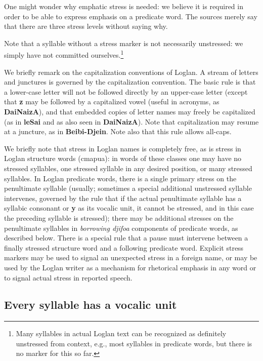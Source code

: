 \documentclass[12pt]{book}
\begin{document}
One might wonder why emphatic stress is needed:  we believe it is required in order to be able to express emphasis on a predicate word.  The sources merely say that there are three stress levels without saying why.

Note that a syllable without a stress marker is not necessarily unstressed:  we simply have not committed ourselves.\footnote{Many syllables in actual Loglan text can be recognized as definitely unstressed from context, e.g., most syllables in predicate words, but there is no marker for this so far.}

We briefly remark on the capitalization conventions of Loglan.  A stream of letters and junctures is governed by the capitalization convention.  The basic rule is that a lower-case letter will not be followed directly by an upper-case letter (except that {\bf z} may be followed by a capitalized vowel (useful in acronyms, as {\bf DaiNaizA}), and that embedded copies of letter names may freely be capitalized (as in {\bf leSai} and as also seen in {\bf DaiNaizA}).  Note that capitalization may resume at a juncture, as in {\bf Beibi-Djein}.  Note also that this rule allows all-caps.

We briefly note that stress in Loglan names is completely free, as is stress in Loglan structure words (cmapua):  in words of these classes one may have no stressed syllables, one stressed syllable in any desired position, or many stressed syllables.  In Loglan predicate words, there is a single primary stress on the penultimate syllable (usually; sometimes a special additional unstressed syllable intervenes, governed by the rule that if the actual penultimate syllable has a syllabic consonant or {\bf y} as its vocalic unit, it cannot be stressed, and in this case the preceding syllable is stressed);  there may be additional stresses
on the penultimate syllables in {\em borrowing djifoa\/} components of predicate words, as described below.  There is a special rule that a pause must intervene between a finally stressed structure word and a following predicate word.  Explicit stress markers may be used to signal an unexpected stress in a foreign name, or may be used by the Loglan writer as a mechanism for rhetorical emphasis in any word or to signal actual stress in reported speech.

\subsection{Every syllable has  a vocalic unit}
\end{document}
